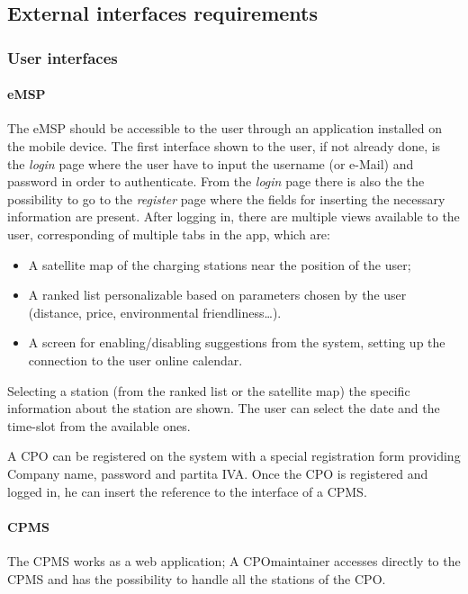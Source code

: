 \subsection{External interfaces requirements}

\subsubsection{User interfaces}
\paragraph{\ac{eMSP}}
The \ac{eMSP} should be accessible to the user through an application installed on the mobile device.
The first interface shown to the user, if not already done, is the \textit{login} page where the user have to input the username (or e-Mail) and password in order to authenticate.
From the \textit{login} page there is also the the possibility to go to the \textit{register} page where the fields for inserting the necessary information are present.
After logging in, there are multiple views available to the user, corresponding of multiple tabs in the app, which are:
\begin{itemize}
    \item A satellite map of the charging stations near the position of the user;
    \item A ranked list personalizable based on parameters chosen by the user (distance, price, environmental friendliness\ldots).
    \item A screen for enabling/disabling suggestions from the system, setting up the connection to the user online calendar.
\end{itemize}
Selecting a station (from the ranked list or the satellite map) the specific information about the station are shown. The user can select the date and the time-slot from the available ones.

A \ac{CPO} can be registered on the system with a special registration form providing Company name, password and \gls{partita IVA}. Once the \ac{CPO} is registered and logged in, he can insert the reference to the interface of a \ac{CPMS}.


\paragraph{\ac{CPMS}}
The \ac{CPMS} works as a web application; A \ac{CPO}maintainer accesses directly to the \ac{CPMS} and has the possibility to handle all the stations of the \ac{CPO}.

